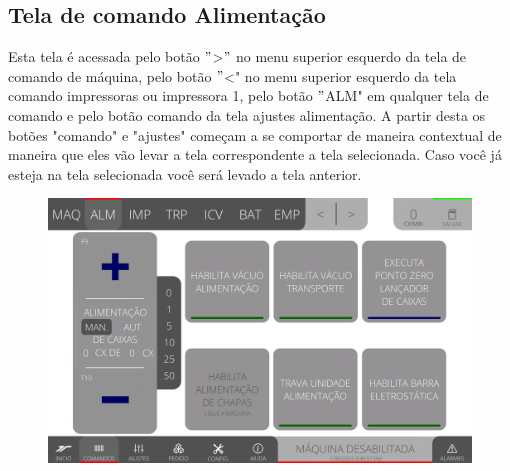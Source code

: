 \thispagestyle{fancy}
\vspace*{40 pt}
\subsection{Tela de comando Alimentação} \label{sec:telaComandoAlimentacao}
Esta tela é acessada pelo botão \("\)\textgreater\("\) no menu superior esquerdo da tela de comando de máquina, pelo botão \("\)\textless{}" no menu superior esquerdo da tela comando impressoras ou impressora 1, pelo botão \("\)ALM" em qualquer tela de comando e pelo botão comando da tela ajustes alimentação. A partir desta os botões "comando" e "ajustes" começam a se comportar de maneira contextual de maneira que eles vão levar a tela correspondente a tela selecionada. Caso você já esteja na tela selecionada você será levado a tela anterior.
\vspace*{\fill}
\begin{figure}[h]
    \centering
    \includegraphics[width=480 px,height=300 px]{src/imagesICV/03-feeder/commands/1.png}
\end{figure}
\vspace*{\fill}

\newpage
\thispagestyle{fancy}
\vspace*{40 pt}
